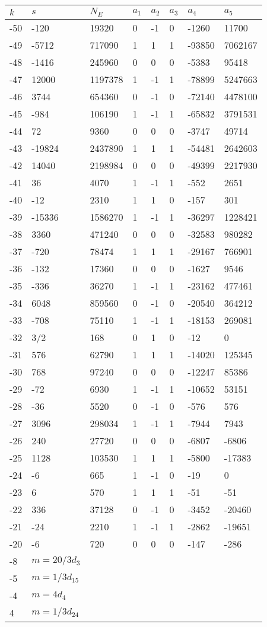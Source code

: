 \documentclass{amsart}
\begin{document}
\begin{longtable}{|l|l|l|lllll|}
\hline
$k$ & $s$ & $N_E$ & $a_1$ & $a_2$ & $a_3$ & $a_4$ & $a_5$\\
\hline
-50&-120&19320&0&-1&0&-1260&11700\\
-49&-5712&717090&1&1&1&-93850&7062167\\
-48&-1416&245960&0&0&0&-5383&95418\\
-47&12000&1197378&1&-1&1&-78899&5247663\\
-46&3744&654360&0&-1&0&-72140&4478100\\
-45&-984&106190&1&-1&1&-65832&3791531\\
-44&72&9360&0&0&0&-3747&49714\\
-43&-19824&2437890&1&1&1&-54481&2642603\\
-42&14040&2198984&0&0&0&-49399&2217930\\
-41&36&4070&1&-1&1&-552&2651\\
-40&-12&2310&1&1&0&-157&301\\
-39&-15336&1586270&1&-1&1&-36297&1228421\\
-38&3360&471240&0&0&0&-32583&980282\\
-37&-720&78474&1&1&1&-29167&766901\\
-36&-132&17360&0&0&0&-1627&9546\\
-35&-336&36270&1&-1&1&-23162&477461\\
-34&6048&859560&0&-1&0&-20540&364212\\
-33&-708&75110&1&-1&1&-18153&269081\\
-32&3/2&168&0&1&0&-12&0\\
-31&576&62790&1&1&1&-14020&125345\\
-30&768&97240&0&0&0&-12247&85386\\
-29&-72&6930&1&-1&1&-10652&53151\\
-28&-36&5520&0&-1&0&-576&576\\
-27&3096&298034&1&-1&1&-7944&7943\\
-26&240&27720&0&0&0&-6807&-6806\\
-25&1128&103530&1&1&1&-5800&-17383\\
-24&-6&665&1&-1&0&-19&0\\
-23&6&570&1&1&1&-51&-51\\
-22&336&37128&0&-1&0&-3452&-20460\\
-21&-24&2210&1&-1&1&-2862&-19651\\
-20&-6&720&0&0&0&-147&-286\\
-8&$m=20/3d_{3}$&&\multicolumn{5}{c|}{}\\
-5&$m=1/3d_{15}$&&\multicolumn{5}{c|}{}\\
-4&$m=4d_{4}$&&\multicolumn{5}{c|}{}\\
4&$m=1/3d_{24}$&&\multicolumn{5}{c|}{}\\
\hline
\end{longtable}
\end{document}
